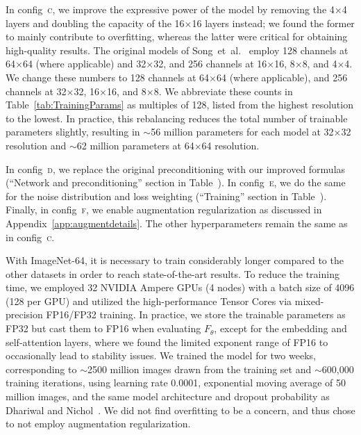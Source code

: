 In config~\textsc{c}, we improve the expressive power of the model by removing the 4$\times$4 layers and doubling the capacity of the 16$\times$16 layers instead; we found the former to mainly contribute to overfitting, whereas the latter were critical for obtaining high-quality results.
The original models of Song~et~al.~\cite{Song2021sde} employ 128 {channels} at 64$\times$64 (where applicable) and 32$\times$32, and 256 {channels} at 16$\times$16, 8$\times$8, and 4$\times$4.
We change these numbers to 128 {channels} at 64$\times$64 (where applicable), and 256 {channels} at 32$\times$32, 16$\times$16, and 8$\times$8.
We abbreviate these counts in Table~\ref{tab:TrainingParams} as multiples of 128, listed from the highest resolution to the lowest.
In practice, this rebalancing reduces the total number of trainable parameters slightly, resulting in $\sim$56 million parameters for each model at 32$\times$32 resolution and $\sim$62 million parameters at 64$\times$64 resolution.

In {config~\textsc{d}}, we replace the original preconditioning with our improved formulas (``Network and preconditioning'' section in Table~).
{In config~\textsc{e}}, we do the same for the noise distribution and loss weighting (``Training'' section in Table~).
{Finally, in config~\textsc{f}}, we enable augmentation regularization as discussed in Appendix~\ref{app:augmentdetails}.
The other hyperparameters remain the same as in config~\textsc{c}.

{
With ImageNet-64, it is necessary to train considerably longer compared to the other datasets in order to reach state-of-the-art results.
To reduce the training time, we employed 32 NVIDIA Ampere GPUs (4 nodes) with a batch size of 4096 (128 per GPU) and utilized the high-performance Tensor Cores via mixed-precision FP16/FP32 training.
In practice, we store the trainable parameters as FP32 but cast them to FP16 when evaluating $F_\theta$, except for the embedding and self-attention layers, where we found the limited exponent range of FP16 to occasionally lead to stability issues.
We trained the model for two weeks, corresponding to $\sim$2500 million images drawn from the training set and $\sim$600,000 training iterations, using learning rate 0.0001, exponential moving average of 50 million images, and the same model architecture and dropout probability as Dhariwal and Nichol~\cite{Dhariwal2021}.
We did not find overfitting to be a concern, and thus chose to not employ augmentation regularization.
}

